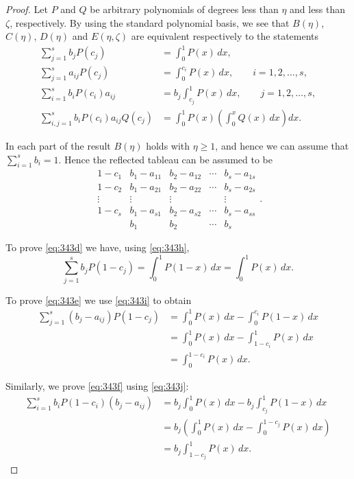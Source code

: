 \begin{proof}
Let $P$ and $Q$ be arbitrary polynomials of degrees less than $\eta$ and less than $\zeta$, respectively. By using the standard polynomial basis, we see that $B(\eta)$, $C(\eta)$, $D(\eta)$ and $E(\eta, \zeta)$ are equivalent respectively to the statements
\begin{align}
\sum_{j=1}^{s} b_j P(c_j) &= \int_{0}^{1} P(x) \, dx, \tag{343h} \\
\sum_{j=1}^{s} a_{ij} P(c_j) &= \int_{0}^{c_i} P(x) \, dx, \qquad i = 1, 2, \dots, s, \tag{343i} \\
\sum_{i=1}^{s} b_i P(c_i) a_{ij} &= b_j \int_{c_j}^{1} P(x) \, dx, \qquad j = 1, 2, \dots, s, \tag{343j} \\
\sum_{i,j=1}^{s} b_i P(c_i) a_{ij} Q(c_j) &= \int_{0}^{1} P(x) \left( \int_{0}^{x} Q(x) \, dx \right) dx. \tag{343k}
\end{align}

In each part of the result $B(\eta)$ holds with $\eta \geq 1$, and hence we can assume that $\sum_{i=1}^{s} b_i = 1$. Hence the reflected tableau can be assumed to be
\[
\begin{array}{ccccc}
1 - c_1 & b_1 - a_{11} & b_2 - a_{12} & \cdots & b_s - a_{1s} \\
1 - c_2 & b_1 - a_{21} & b_2 - a_{22} & \cdots & b_s - a_{2s} \\
\vdots  & \vdots       & \vdots       &        & \vdots       \\
1 - c_s & b_1 - a_{s1} & b_2 - a_{s2} & \cdots & b_s - a_{ss} \\
        & b_1          & b_2          & \cdots & b_s
\end{array}.
\]

To prove \eqref{eq:343d} we have, using \eqref{eq:343h},
\[
\sum_{j=1}^{s} b_j P(1 - c_j) = \int_{0}^{1} P(1 - x) \, dx = \int_{0}^{1} P(x) \, dx.
\]

To prove \eqref{eq:343e} we use \eqref{eq:343i} to obtain
\begin{align*}
\sum_{j=1}^{s} (b_j - a_{ij}) P(1 - c_j) &= \int_{0}^{1} P(x) \, dx - \int_{0}^{c_i} P(1 - x) \, dx \\
&= \int_{0}^{1} P(x) \, dx - \int_{1 - c_i}^{1} P(x) \, dx \\
&= \int_{0}^{1 - c_i} P(x) \, dx.
\end{align*}

Similarly, we prove \eqref{eq:343f} using \eqref{eq:343j}:
\begin{align*}
\sum_{i=1}^{s} b_i P(1 - c_i)(b_j - a_{ij}) &= b_j \int_{0}^{1} P(x) \, dx - b_j \int_{c_j}^{1} P(1 - x) \, dx \\
&= b_j \left( \int_{0}^{1} P(x) \, dx - \int_{0}^{1 - c_j} P(x) \, dx \right) \\
&= b_j \int_{1 - c_j}^{1} P(x) \, dx.
\end{align*}


\end{proof}
